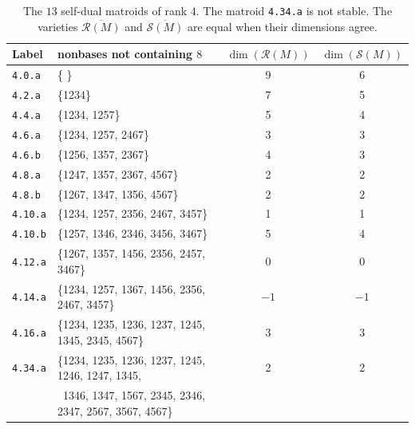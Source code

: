 \documentclass[12pt]{extarticle}
\theoremstyle{definition}
\numberwithin{theorem}{section}
\theoremstyle{plain}\newtheorem{ithm}{Theorem}
\begin{document}
\begin{table}[h]
  \begin{tabular}{llcc}
    Label & nonbases not containing $8$ & $\!\!\!\!\dim(\mathcal{R}(M))$ & $\dim(\mathcal{S}(M))$\\
    \hline
    
   \texttt{4.0.a} & \{ \}  & 9&6
   \\
    \texttt{4.2.a} &  \{1234\} & 7&5  \\
    \texttt{4.4.a} & \{1234, 1257\} & 5&4 \\
    \texttt{4.6.a} & \{1234, 1257, 2467\}  &3 &3\\
    \texttt{4.6.b} & \{1256, 1357, 2367\} & 4&  3\\
    \texttt{4.8.a} & \{1247, 1357, 2367, 4567\}  & 2&2 \\
    \texttt{4.8.b} & \{1267, 1347, 1356, 4567\}  & 2&2 \\
    \texttt{4.10.a} & \{1234, 1257,  2356, 2467, 3457\}  & 1&1  \\
    \texttt{4.10.b} &  \{1257, 1346, 2346, 3456, 3467\}
 & 5&4\\
    \texttt{4.12.a} &\{1267, 1357, 1456, 2356, 2457, 3467\}  & 0&0   \\
    \texttt{4.14.a}  &\{1234, 1257, 1367, 1456, 2356, 2467, 3457\}
   & $-1$ & $-1$  \\
    \texttt{4.16.a} & \{1234, 1235, 1236, 1237, 1245, 1345, 2345, 4567\} & 3&3\\
    \texttt{4.34.a} & 
    \{1234, 1235, 1236, 1237, 1245, 1246, 1247, 1345, & 2 & 2\\ &
\,\,\,1346, 1347, 1567, 2345, 2346, 2347, 2567, 3567, 4567\} \!\!
  \end{tabular}
\caption{The $13$ self-dual matroids of rank $4$. The matroid \texttt{4.34.a} is not stable.
The varieties $\overline{\mathcal{R}(M)}$ and $\overline{\mathcal{S}(M)}$  are equal when their dimensions agree.
}\label{tab:rank4}
\end{table}
\end{document}
